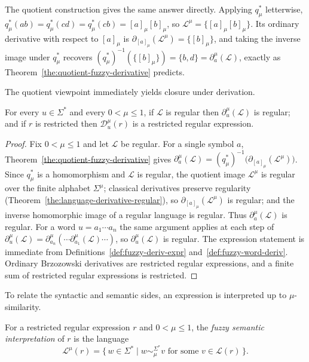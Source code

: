 The quotient construction gives the same answer directly. Applying $q_\mu^{*}$
letterwise, $q_\mu^{*}(ab)=q_\mu^{*}(cd)=q_\mu^{*}(cb)=[a]_\mu[b]_\mu$, so
$\mathcal{L}^{\mu}=\{[a]_\mu[b]_\mu\}$. Its ordinary derivative with respect to
$[a]_\mu$ is $\partial_{[a]_\mu}(\mathcal{L}^{\mu})=\{[b]_\mu\}$, and taking the
inverse image under $q_\mu^{*}$ recovers
$(q_\mu^{*})^{-1}(\{[b]_\mu\})=\{b,d\}=\partial_a^{\mu}(\mathcal{L})$, exactly as
Theorem~\ref{the:quotient-fuzzy-derivative} predicts.

\medskip
The quotient viewpoint immediately yields closure under derivation.

\begin{theorem}\label{the:fuzzy-regular}
For every $u\in\Sigma^{*}$ and every $0<\mu\le1$, if $\mathcal{L}$ is regular then
$\partial_u^{\mu}(\mathcal{L})$ is regular; and if $r$ is restricted then
$\mathcal{D}_u^{\mu}(r)$ is a restricted regular expression.
\end{theorem}

\begin{proof}
Fix $0<\mu\le1$ and let $\mathcal{L}$ be regular. For a single symbol $a$,
Theorem~\ref{the:quotient-fuzzy-derivative} gives
$\partial_a^{\mu}(\mathcal{L})=(q_\mu^{*})^{-1}\bigl(\partial_{[a]_\mu}(\mathcal{L}^{\mu})\bigr)$.
Since $q_\mu^{*}$ is a homomorphism and $\mathcal{L}$ is regular, the quotient image
$\mathcal{L}^{\mu}$ is regular over the finite alphabet $\Sigma^{\mu}$; classical
derivatives preserve regularity (Theorem~\ref{the:language-derivative-regular}), so
$\partial_{[a]_\mu}(\mathcal{L}^{\mu})$ is regular; and the inverse homomorphic image
of a regular language is regular. Thus $\partial_a^{\mu}(\mathcal{L})$ is regular.
For a word $u=a_1\cdots a_n$ the same argument applies at each step of
$\partial_u^{\mu}(\mathcal{L})=\partial_{a_n}^{\mu}(\cdots\partial_{a_1}^{\mu}(\mathcal{L})\cdots)$,
so $\partial_u^{\mu}(\mathcal{L})$ is regular. The expression statement is immediate
from Definitions~\ref{def:fuzzy-deriv-expr} and~\ref{def:fuzzy-word-deriv}. Ordinary
Brzozowski derivatives are restricted regular expressions, and a finite sum of
restricted regular expressions is restricted.
\end{proof}

To relate the syntactic and semantic sides, an expression is interpreted up to
$\mu$-similarity.

\begin{definition}\label{def:fuzzy-sem}
For a restricted regular expression $r$ and $0<\mu\le1$, the \emph{fuzzy semantic
interpretation} of $r$ is the language
\[
\mathcal{L}^{\mu}(r)=\{\,w\in\Sigma^{*}\mid w\sim_\mu^{\Sigma^{*}} v
   \text{ for some } v\in\mathcal{L}(r)\,\}.
\]
\end{definition}

